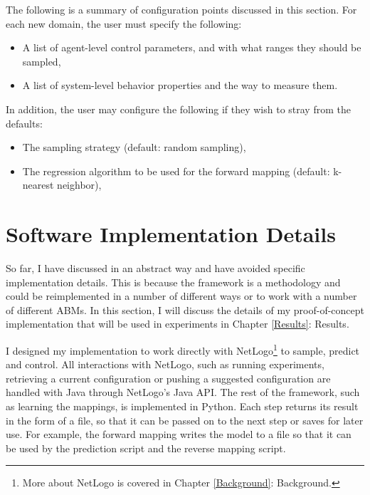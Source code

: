 The following is a summary of configuration points discussed in this section.
For each new domain, the user must specify the following:
\begin{itemize}
   \item A list of agent-level control parameters, and with what ranges they should be sampled,
   \item A list of system-level behavior properties and the way to measure them.
\end{itemize}

In addition, the user may configure the following if they wish to stray from the defaults:
\begin{itemize}
   \item The sampling strategy (default: random sampling),
   \item The regression algorithm to be used for the forward mapping (default: k-nearest neighbor),
\end{itemize}


\section{Software Implementation Details}
So far, I have discussed \fw in an abstract way and have avoided specific implementation details.
This is because the framework is a methodology and could be reimplemented in a number of different ways or to work with a number of different ABMs.
In this section, I will discuss the details of my proof-of-concept implementation that will be used in experiments in Chapter \ref{Results}: Results.

I designed my implementation to work directly with NetLogo\footnote{More about NetLogo is covered in Chapter \ref{Background}: Background.} to sample, predict and control.
All interactions with NetLogo, such as running experiments, retrieving a current configuration or pushing a suggested configuration are handled with Java through NetLogo's Java API.
The rest of the framework, such as learning the mappings, is implemented in Python.
Each step returns its result  in the form of a file, so that it can be passed on to the next step or saves for later use.
For example, the forward mapping writes the model to a file so that it can be used by the prediction script and the reverse mapping script.


